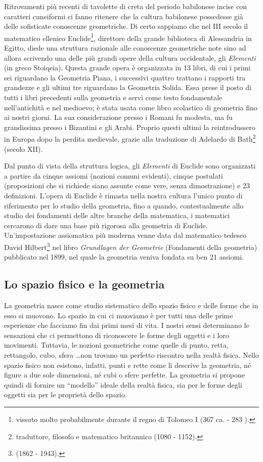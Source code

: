 Ritrovamenti più recenti di tavolette di creta del periodo babilonese 
incise con caratteri cuneiformi ci fanno ritenere che la cultura 
babilonese possedesse già delle sofisticate conoscenze geometriche. 
Di certo sappiamo che nel III secolo \aC{} il matematico ellenico 
Euclide\footnote{vissuto molto probabilmente durante il regno di 
Tolomeo I (367 \aC{} ca. - 283 \aC).}, direttore della grande 
biblioteca di Alessandria in Egitto, diede una struttura razionale 
alle conoscenze geometriche note sino ad allora scrivendo una delle 
più grandi opere della cultura occidentale, gli \emph{Elementi} (in 
greco \textgreek{Stoiqeia}). Questa grande opera è organizzata in 13 
libri, di cui i primi sei riguardano la Geometria Piana, i successivi 
quattro trattano i rapporti tra grandezze e gli ultimi tre riguardano 
la Geometria Solida. Essa prese il posto di tutti i libri precedenti 
sulla geometria e servì come testo fondamentale nell'antichità e nel 
medioevo; è stata usata come libro scolastico di geometria fino ai 
nostri giorni. La sua considerazione presso i Romani fu modesta, ma 
fu grandissima presso i Bizantini e gli Arabi. Proprio questi ultimi 
la reintrodussero in Europa dopo la perdita medievale, grazie alla 
traduzione di Adelardo di Bath\footnote{traduttore, filosofo e 
matematico britannico (1080 - 1152).} (secolo XII).

Dal punto di vista della struttura logica, gli \emph{Elementi} di 
Euclide sono organizzati a partire da cinque assiomi (nozioni comuni 
evidenti), cinque postulati (proposizioni che si richiede siano 
assunte come vere, senza dimostrazione) e 23 definizioni. L'opera di 
Euclide è rimasta nella nostra cultura l'unico punto di riferimento 
per lo studio della geometria, fino a quando, contestualmente allo 
studio dei fondamenti delle altre branche della matematica, i 
matematici cercarono di dare una base più rigorosa alla geometria di 
Euclide. Un'impostazione assiomatica più moderna venne data dal 
matematico tedesco David Hilbert\footnote{(1862 - 1943).} nel libro 
\emph{Grundlagen der Geometrie} (Fondamenti della geometria) 
pubblicato nel 1899, nel quale la geometria veniva fondata su ben 21 
assiomi.

\subsection{Lo spazio fisico e la geometria}
La geometria nasce come studio sistematico dello spazio fisico e 
delle forme che in esso si muovono. Lo spazio in cui ci muoviamo è per 
tutti una delle prime esperienze che facciamo fin dai primi mesi di 
vita. I nostri sensi determinano le sensazioni che ci permettono di 
riconoscere le forme degli oggetti e i loro movimenti. Tuttavia, le 
nozioni geometriche come quelle di punto, retta, rettangolo, cubo, 
sfera \ldots non trovano un perfetto riscontro nella realtà fisica. 
Nello spazio fisico non esistono, infatti, punti e rette come li 
descrive la geometria, né figure a due sole dimensioni, né cubi o 
sfere perfette. La geometria si propone quindi di fornire un 
``modello'' ideale della realtà fisica, sia per le forme degli 
oggetti sia per le proprietà dello spazio. 

